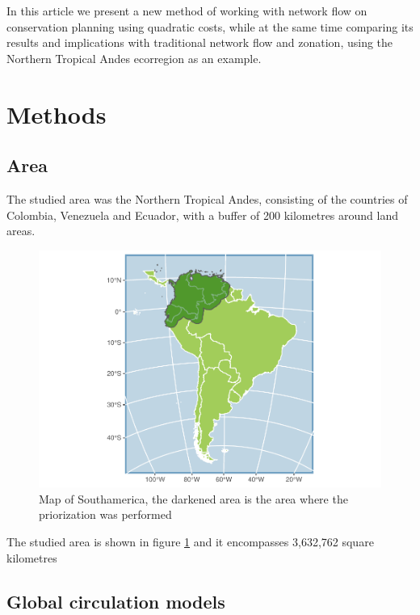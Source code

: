 \documentclass[]{article}
\begin{document}
In this article we present a new method of working with network flow on conservation planning using quadratic costs, while at the same time comparing its results and implications with traditional network flow and zonation, using the Northern Tropical Andes ecorregion as an example.

\hypertarget{methods}{%
\section{Methods}\label{methods}}

\hypertarget{area}{%
\subsection{Area}\label{area}}

The studied area was the Northern Tropical Andes, consisting of the countries of Colombia, Venezuela and Ecuador, with a buffer of 200 kilometres around land areas.

\begin{figure}

{\centering \includegraphics{NFPaper_files/figure-latex/MapArea-1} 

}

\caption{Map of Southamerica, the darkened area is the area where the priorization was performed}\label{fig:MapArea}
\end{figure}

The studied area is shown in figure \ref{fig:MapArea} and it encompasses 3,632,762 square kilometres

\hypertarget{global-circulation-models}{%
\subsection{Global circulation models}\label{global-circulation-models}}
\end{document}

